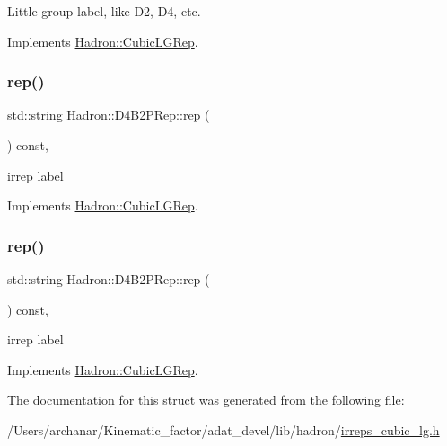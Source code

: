 Little-\/group label, like D2, D4, etc. 

Implements \mbox{\hyperlink{structHadron_1_1CubicLGRep_a9bdb14b519a611d21379ed96a3a9eb41}{Hadron\+::\+Cubic\+L\+G\+Rep}}.

\mbox{\label{structHadron_1_1D4B2PRep_abe22fc63677217f78086bf135b443912}} 
\subsubsection{\texorpdfstring{rep()}{rep()}\hspace{0.1cm}{\footnotesize\ttfamily [1/2]}}
{\footnotesize\ttfamily std\+::string Hadron\+::\+D4\+B2\+P\+Rep\+::rep (\begin{DoxyParamCaption}{ }\end{DoxyParamCaption}) const\hspace{0.3cm}{\ttfamily [inline]}, {\ttfamily [virtual]}}

irrep label 

Implements \mbox{\hyperlink{structHadron_1_1CubicLGRep_a50f5ddbb8f4be4cee0106fa9e8c75e6c}{Hadron\+::\+Cubic\+L\+G\+Rep}}.

\mbox{\label{structHadron_1_1D4B2PRep_abe22fc63677217f78086bf135b443912}} 
\subsubsection{\texorpdfstring{rep()}{rep()}\hspace{0.1cm}{\footnotesize\ttfamily [2/2]}}
{\footnotesize\ttfamily std\+::string Hadron\+::\+D4\+B2\+P\+Rep\+::rep (\begin{DoxyParamCaption}{ }\end{DoxyParamCaption}) const\hspace{0.3cm}{\ttfamily [inline]}, {\ttfamily [virtual]}}

irrep label 

Implements \mbox{\hyperlink{structHadron_1_1CubicLGRep_a50f5ddbb8f4be4cee0106fa9e8c75e6c}{Hadron\+::\+Cubic\+L\+G\+Rep}}.



The documentation for this struct was generated from the following file\+:\begin{DoxyCompactItemize}
\item 
/\+Users/archanar/\+Kinematic\+\_\+factor/adat\+\_\+devel/lib/hadron/\mbox{\hyperlink{lib_2hadron_2irreps__cubic__lg_8h}{irreps\+\_\+cubic\+\_\+lg.\+h}}\end{DoxyCompactItemize}
